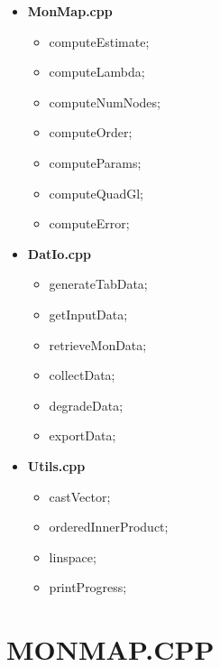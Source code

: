 \documentclass[a4paper, twosided]{book}
\begin{document}
\begin{itemize}
    \item \ttfamily \color{poliDarkBlue}\textbf{MonMap.cpp} \color{black}
          \begin{itemize}
                 \item \ttfamily computeEstimate;
                 \item \ttfamily computeLambda;
                 \item \ttfamily computeNumNodes;
                 \item \ttfamily computeOrder;
                 \item \ttfamily computeParams;
                 \item \ttfamily computeQuadGl;
                 \item \ttfamily computeError;
          \end{itemize}
          
   \item \ttfamily \color{poliDarkBlue}\textbf{DatIo.cpp} \color{black}
          \begin{itemize}
                 \item \ttfamily generateTabData;
                 \item \ttfamily getInputData;
                 \item \ttfamily retrieveMonData;
                 \item \ttfamily collectData;
                 \item \ttfamily degradeData;
                 \item \ttfamily exportData;
          \end{itemize}
          
    \item \ttfamily \color{poliDarkBlue}\textbf{Utils.cpp} \color{black}
          \begin{itemize}
                 \item \ttfamily castVector;
                 \item \ttfamily orderedInnerProduct;
                 \item \ttfamily linspace;
                 \item \ttfamily printProgress;
          \end{itemize}
\end{itemize}

\newpage
\section[MonMap.cpp]{\changefont MONMAP.CPP}\label{Sec4.1}
\end{document}
